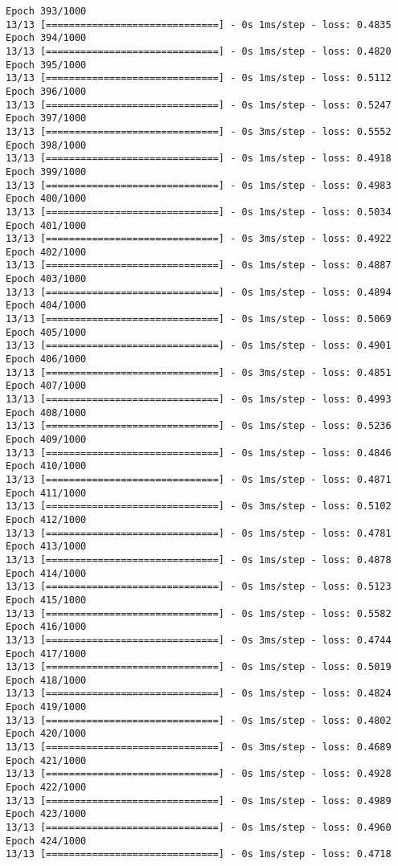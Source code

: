 \documentclass[11pt]{article}
\begin{document}
\begin{Verbatim}[commandchars=\\\{\}]
Epoch 393/1000
13/13 [==============================] - 0s 1ms/step - loss: 0.4835
Epoch 394/1000
13/13 [==============================] - 0s 1ms/step - loss: 0.4820
Epoch 395/1000
13/13 [==============================] - 0s 1ms/step - loss: 0.5112
Epoch 396/1000
13/13 [==============================] - 0s 1ms/step - loss: 0.5247
Epoch 397/1000
13/13 [==============================] - 0s 3ms/step - loss: 0.5552
Epoch 398/1000
13/13 [==============================] - 0s 1ms/step - loss: 0.4918
Epoch 399/1000
13/13 [==============================] - 0s 1ms/step - loss: 0.4983
Epoch 400/1000
13/13 [==============================] - 0s 1ms/step - loss: 0.5034
Epoch 401/1000
13/13 [==============================] - 0s 3ms/step - loss: 0.4922
Epoch 402/1000
13/13 [==============================] - 0s 1ms/step - loss: 0.4887
Epoch 403/1000
13/13 [==============================] - 0s 1ms/step - loss: 0.4894
Epoch 404/1000
13/13 [==============================] - 0s 1ms/step - loss: 0.5069
Epoch 405/1000
13/13 [==============================] - 0s 1ms/step - loss: 0.4901
Epoch 406/1000
13/13 [==============================] - 0s 3ms/step - loss: 0.4851
Epoch 407/1000
13/13 [==============================] - 0s 1ms/step - loss: 0.4993
Epoch 408/1000
13/13 [==============================] - 0s 1ms/step - loss: 0.5236
Epoch 409/1000
13/13 [==============================] - 0s 1ms/step - loss: 0.4846
Epoch 410/1000
13/13 [==============================] - 0s 1ms/step - loss: 0.4871
Epoch 411/1000
13/13 [==============================] - 0s 3ms/step - loss: 0.5102
Epoch 412/1000
13/13 [==============================] - 0s 1ms/step - loss: 0.4781
Epoch 413/1000
13/13 [==============================] - 0s 1ms/step - loss: 0.4878
Epoch 414/1000
13/13 [==============================] - 0s 1ms/step - loss: 0.5123
Epoch 415/1000
13/13 [==============================] - 0s 1ms/step - loss: 0.5582
Epoch 416/1000
13/13 [==============================] - 0s 3ms/step - loss: 0.4744
Epoch 417/1000
13/13 [==============================] - 0s 1ms/step - loss: 0.5019
Epoch 418/1000
13/13 [==============================] - 0s 1ms/step - loss: 0.4824
Epoch 419/1000
13/13 [==============================] - 0s 1ms/step - loss: 0.4802
Epoch 420/1000
13/13 [==============================] - 0s 3ms/step - loss: 0.4689
Epoch 421/1000
13/13 [==============================] - 0s 1ms/step - loss: 0.4928
Epoch 422/1000
13/13 [==============================] - 0s 1ms/step - loss: 0.4989
Epoch 423/1000
13/13 [==============================] - 0s 1ms/step - loss: 0.4960
Epoch 424/1000
13/13 [==============================] - 0s 1ms/step - loss: 0.4718

\end{Verbatim}
\end{document}
